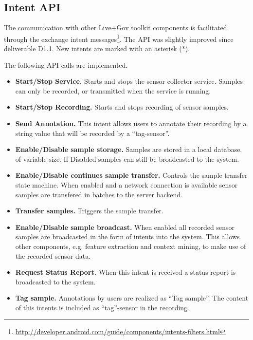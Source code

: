 \subsection{Intent API}


\label{subsubsec:IntentAPIdescription}

The communication with other Live+Gov toolkit components is
facilitated through the exchange intent
messages\footnote{\url{http://developer.android.com/guide/components/intents-filters.html}}. 
The API was slightly improved since deliverable D1.1. New intents are
marked with an asterisk (*).

The following API-calls are implemented.
\begin{itemize}
\item {\bfseries Start/Stop Service.} Starts and stops the sensor
  collector service. Samples can only be recorded, or transmitted when
  the service is running.
\item {\bfseries Start/Stop Recording.} Starts and stops recording of
  sensor samples.
\item {\bf Send Annotation.} This intent allows users to annotate
  their recording by a string value that will be recorded by a
  ``tag-sensor''.
\item {\bfseries Enable/Disable sample storage.} Samples are stored in
  a local database, of variable size. If Disabled samples can still be
  broadcasted to the system.
\item {\bfseries Enable/Disable continues sample transfer.} Controls
  the sample transfer state machine. When enabled and a network
  connection is available sensor samples are transfered in batches to
  the server backend.
\item {\bfseries Transfer samples.} Triggers the sample transfer.
\item {\bfseries Enable/Disable sample broadcast.} When enabled all
  recorded sensor samples are broadcasted in the form of intents into
  the system. This allows other components, e.g. feature extraction
  and context mining, to make use of the recorded sensor data.
\item {\bfseries Request Status Report.} When this intent is received
  a status report is broadcasted to the system.
\item {\bfseries Tag sample.}  Annotations by users are realized as
  ``Tag sample''.  The content of this intents is included as
  ``tag''-sensor in the recording.
\end{itemize}

